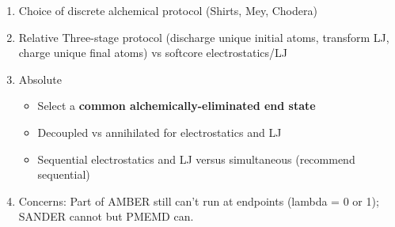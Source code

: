 \documentclass[9pt,bestpractices]{livecoms}
\begin{document}
\begin{enumerate}
\item Choice of discrete alchemical protocol (Shirts, Mey, Chodera)
\item Relative
Three-stage protocol (discharge unique initial atoms, transform LJ, charge unique final atoms) vs softcore electrostatics/LJ

\item Absolute
	\begin{itemize}
	\item Select a \textbf{common alchemically-eliminated end state}
	\item Decoupled vs annihilated for electrostatics and LJ
	\item Sequential electrostatics and LJ versus simultaneous (recommend sequential)

\end{itemize}
\item Concerns:
Part of AMBER still can’t run at endpoints (lambda = 0 or 1); SANDER cannot but PMEMD can.

\end{enumerate}
\end{document}
